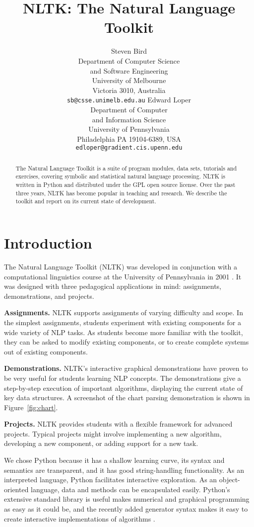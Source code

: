 \documentclass[11pt]{article}
\title{NLTK: The Natural Language Toolkit}
\author{
  Steven Bird \\
  Department of Computer Science \\
  \indent and Software Engineering \\
  University of Melbourne \\
  Victoria 3010, Australia \\  
  {\tt sb@csse.unimelb.edu.au}
\And
  Edward Loper\\
  Department of Computer \\
  \indent and Information Science \\
  University of Pennsylvania\\
  Philadelphia PA 19104-6389, USA\\
  {\tt edloper@gradient.cis.upenn.edu}
}
\date{}
\begin{document}
\maketitle

\begin{abstract}
  The Natural Language Toolkit is a suite of program modules, data
  sets, tutorials and exercises, covering symbolic and statistical
  natural language processing.  NLTK is written in Python and
  distributed under the GPL open source license.  Over the past three
  years, NLTK has become popular in teaching and research.  We
  describe the toolkit and report on its current state of development.
\end{abstract}

\section{Introduction}

The Natural Language Toolkit (NLTK) was developed in conjunction with
a computational linguistics course at the University of Pennsylvania
in 2001 \cite{LoperBird02}.  It was designed with three pedagogical
applications in mind: assignments, demonstrations, and projects.

\textbf{Assignments.}
NLTK supports assignments of varying difficulty
and scope.  In the simplest assignments, students experiment with
existing components for a wide variety of NLP tasks.  As students
become more familiar with the toolkit, they can be asked to modify
existing components, or to create complete systems out of existing
components.

\textbf{Demonstrations.}
NLTK's interactive graphical demonstrations have proven to be very
useful for students learning NLP concepts.
The demonstrations give a step-by-step execution of important
algorithms, displaying the current state of key data structures.
A screenshot of the chart parsing demonstration is shown in Figure~\ref{fig:chart}.

\textbf{Projects.}  NLTK provides students with a flexible framework
for advanced projects.  Typical projects might involve implementing a
new algorithm, developing a new component, or adding support for a new
task.

We chose Python because it has a shallow learning curve, its syntax
and semantics are transparent, and it has good string-handling
functionality.  As an interpreted language, Python facilitates
interactive exploration.  As an object-oriented language, data and
methods can be encapsulated easily.  Python's extensive standard
library is useful makes numerical and graphical programming as easy as
it could be, and the recently added generator syntax makes it easy to
create interactive implementations of algorithms
\cite{Loper04,Rossum03intro,Rossum03ref}.
\end{document}
